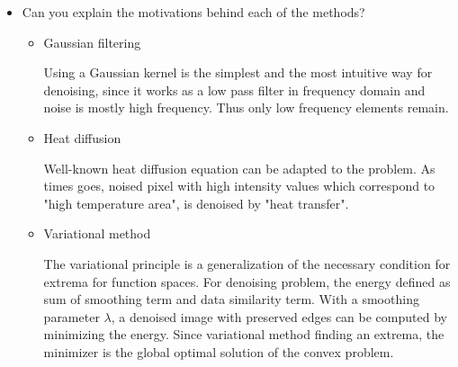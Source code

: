 \documentclass[paper=a4, fontsize=11pt]{scrartcl} %
\numberwithin{equation}{section} %
\numberwithin{figure}{section} %
\numberwithin{table}{section} %
\begin{document}
\begin{itemize}
	\item Can you explain the motivations behind each of the methods? 
	
	\begin{itemize}
		\item Gaussian filtering
		
		Using a Gaussian kernel is the simplest and the most intuitive way for denoising, since it works as a low pass filter in frequency domain and noise is mostly high frequency. Thus only low frequency elements remain.
		 
		\item Heat diffusion 

		Well-known heat diffusion equation can be adapted to the problem. As times goes, noised pixel with high intensity values which correspond to "high temperature area", is denoised by "heat transfer". 
		
		\item Variational method
		
		The variational principle is a generalization of the necessary condition for extrema for function spaces. For denoising problem, the energy defined as sum of smoothing term and data similarity term. With a smoothing parameter $\lambda$, a denoised image with preserved edges can be computed by minimizing the energy. Since variational method finding an extrema, the minimizer is the global optimal solution of the convex problem.   
		
	\end{itemize}
\end{itemize}



 

\end{document}

